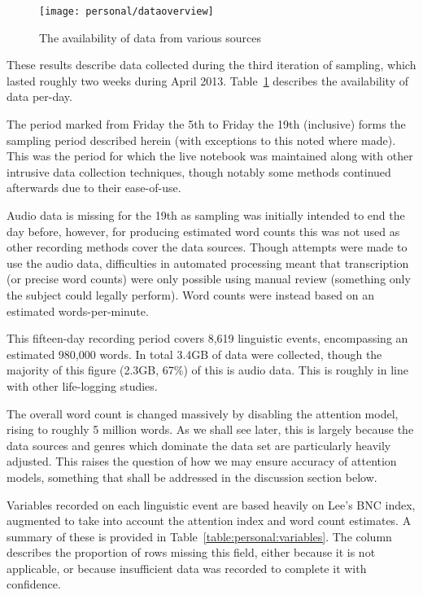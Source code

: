 

\begin{figure}[hp]
    \centering
    \begin{sideways}
        \texttt{[image: personal/dataoverview]}
    \end{sideways}
    \caption{The availability of data from various sources}
    \label{fig:personal:dataoverview}
\end{figure}
\FloatBarrier{}

These results describe data collected during the third iteration of sampling, which lasted roughly two weeks during April 2013.  Table~\ref{fig:personal:dataoverview} describes the availability of data per-day.

The period marked from Friday the 5th to Friday the 19th (inclusive) forms the sampling period described herein (with exceptions to this noted where made).  This was the period for which the live notebook was maintained along with other intrusive data collection techniques, though notably some methods continued afterwards due to their ease-of-use.

Audio data is missing for the 19th as sampling was initially intended to end the day before, however, for producing estimated word counts this was not used as other recording methods cover the data sources.  Though attempts were made to use the audio data, difficulties in automated processing meant that transcription (or precise word counts) were only possible using manual review (something only the subject could legally perform).  Word counts were instead based on an estimated words-per-minute.


This fifteen-day recording period covers 8,619 linguistic events, encompassing an estimated 980,000 words.  In total 3.4GB of data were collected, though the majority of this figure (2.3GB, 67\%) of this is audio data.  This is roughly in line with other life-logging studies\cite{gemmell2006mylifebits}.

The overall word count is changed massively by disabling the attention model, rising to roughly 5 million words.  As we shall see later, this is largely because the data sources and genres which dominate the data set are particularly heavily adjusted.  This raises the question of how we may ensure accuracy of attention models, something that shall be addressed in the discussion section below.




Variables recorded on each linguistic event are based heavily on Lee's BNC index, augmented to take into account the attention index and word count estimates.  A summary of these is provided in Table~\ref{table:personal:variables}.  The  column describes the proportion of rows missing this field, either because it is not applicable, or because insufficient data was recorded to complete it with confidence.

